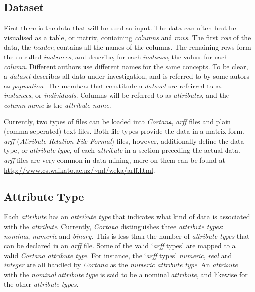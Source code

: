 \documentclass{article}
\begin{document}
\subsection{Dataset}
\label{preliminaries:dataset}
First there is the data that will be used as input.
The data can often best be visualised as a table, or matrix, containing \emph{columns} and \emph{rows}.
The first \emph{row} of the data, the \emph{header}, contains all the names of the columns.
The remaining rows form the so called \emph{instances}, and describe, for each \emph{instance}, the values for each \emph{column}.
Different authors use different names for the same concepts.
To be clear, a \emph{dataset} describes all data under investigation, and is referred to by some autors as \emph{population}.
The members that constitude a \emph{dataset} are refeirred to as \emph{instances}, or \emph{individuals}.
Columns will be referred to as \emph{attributes}, and the \emph{column name} is the \emph{attribute name}.

Currently, two types of files can be loaded into \emph{Cortana}, \emph{arff} files and plain (comma seperated) text files.
Both file types provide the data in a matrix form.
\emph{arff} (\emph{Attribute-Relation File Format}) files, however, additionally define the data type, or \emph{attribute type}, of each \emph{attribute} in a section preceding the actual data.
\emph{arff} files are very common in data mining, more on them can be found at \url{http://www.cs.waikato.ac.nz/~ml/weka/arff.html}.



\subsection{Attribute Type}
\label{preliminaries:attribute-type}
Each \emph{attribute} has an \emph{attribute type} that indicates what kind of data is associated with the \emph{attribute}.
Currently, \emph{Cortana} distinguishes three \emph{attribute types}: \emph{nominal}, \emph{numeric} and \emph{binary}.
This is less than the number of \emph{attribute types} that can be declared in an \emph{arff} file.
Some of the valid `\emph{arff} types' are mapped to a valid \emph{Cortana} \emph{attribute type}.
For instance, the `\emph{arff} types' \emph{numeric}, \emph{real} and \emph{integer} are all handled by \emph{Cortana} as the \emph{numeric} \emph{attribute type}.
An \emph{attribute} with the \emph{nominal} \emph{attribute type} is said to be a nominal \emph{attribute}, and likewise for the other \emph{attribute types}.
\end{document}
